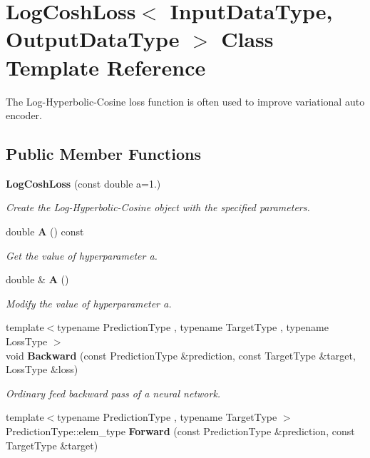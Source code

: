 \section{Log\+Cosh\+Loss$<$ Input\+Data\+Type, Output\+Data\+Type $>$ Class Template Reference}
\label{classmlpack_1_1ann_1_1LogCoshLoss}


The Log-\/\+Hyperbolic-\/\+Cosine loss function is often used to improve variational auto encoder.  


\subsection*{Public Member Functions}
\begin{DoxyCompactItemize}
\item 
\textbf{ Log\+Cosh\+Loss} (const double a=1.)
\begin{DoxyCompactList}\small\item\em Create the Log-\/\+Hyperbolic-\/\+Cosine object with the specified parameters. \end{DoxyCompactList}\item 
double \textbf{ A} () const
\begin{DoxyCompactList}\small\item\em Get the value of hyperparameter a. \end{DoxyCompactList}\item 
double \& \textbf{ A} ()
\begin{DoxyCompactList}\small\item\em Modify the value of hyperparameter a. \end{DoxyCompactList}\item 
{\footnotesize template$<$typename Prediction\+Type , typename Target\+Type , typename Loss\+Type $>$ }\\void \textbf{ Backward} (const Prediction\+Type \&prediction, const Target\+Type \&target, Loss\+Type \&loss)
\begin{DoxyCompactList}\small\item\em Ordinary feed backward pass of a neural network. \end{DoxyCompactList}\item 
{\footnotesize template$<$typename Prediction\+Type , typename Target\+Type $>$ }\\Prediction\+Type\+::elem\+\_\+type \textbf{ Forward} (const Prediction\+Type \&prediction, const Target\+Type \&target)

\end{DoxyCompactItemize}
